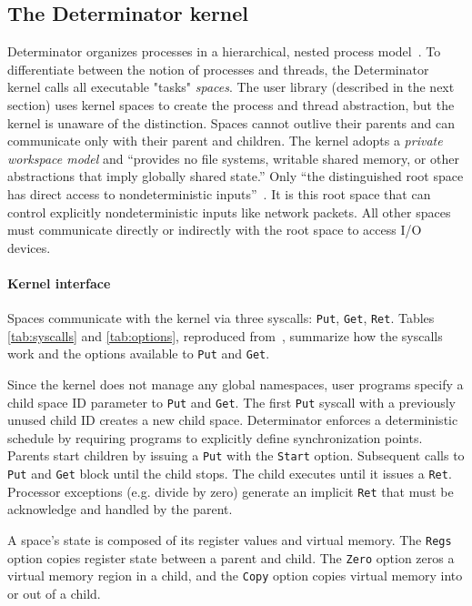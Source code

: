 \subsection{The Determinator kernel}

Determinator organizes processes in a hierarchical, nested
process model~\cite{Ford96,Aviram10}. To differentiate between the notion of
processes and threads, the Determinator kernel calls all executable "tasks"
\emph{spaces}. The user library (described in the next section) uses kernel
spaces to create the process and thread abstraction, but the kernel is unaware
of the distinction.
Spaces cannot outlive their parents and can communicate only with their
parent and children. The kernel adopts a \emph{private workspace model} and
``provides no file systems, writable shared
memory, or other abstractions that imply globally shared state.'' Only ``the
distinguished root space has direct access to nondeterministic
inputs''~\cite{Aviram10}. It is this root space that can control explicitly
nondeterministic inputs like network packets. All other spaces must
communicate directly or indirectly with the root space to access I/O devices.




\paragraph{Kernel interface} Spaces communicate with the kernel via three
syscalls: {\tt Put}, {\tt Get}, {\tt Ret}. Tables \ref{tab:syscalls} and
\ref{tab:options}, reproduced from~\cite{Aviram10}, summarize how the syscalls
work and the options available to {\tt Put} and {\tt Get}.

Since the kernel does not manage any global namespaces, user programs specify
a child space ID parameter to {\tt Put} and {\tt Get}. The first {\tt Put}
syscall with a previously unused child ID creates a new child space.
Determinator enforces a deterministic schedule by requiring programs to
explicitly define synchronization points. Parents start children by issuing a
{\tt Put} with the {\tt Start} option. Subsequent calls to {\tt Put} and
{\tt Get} block until the child stops. The child executes until it issues a
{\tt Ret}. Processor exceptions (e.g. divide by zero) generate an implicit
{\tt Ret} that must be acknowledge and handled by the parent.

A space's state is composed of its register values and virtual memory.
The {\tt Regs} option copies register state between a parent and child.
The {\tt Zero} option zeros a virtual memory region in a child, and the
{\tt Copy} option copies virtual memory into or out of a child.

